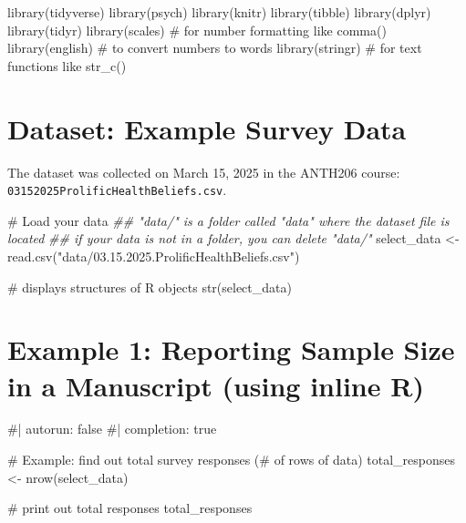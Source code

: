 \documentclass[
  english,
  letterpaper,
  DIV=11,
  numbers=noendperiod]{scrreprt}
\newenvironment{Shaded}{\begin{snugshade}}{\end{snugshade}}
\newcommand{\CommentTok}[1]{\textcolor[rgb]{0.37,0.37,0.37}{#1}}
\newcommand{\DocumentationTok}[1]{\textcolor[rgb]{0.37,0.37,0.37}{\textit{#1}}}
\newcommand{\FunctionTok}[1]{\textcolor[rgb]{0.28,0.35,0.67}{#1}}
\newcommand{\NormalTok}[1]{\textcolor[rgb]{0.00,0.23,0.31}{#1}}
\newcommand{\OtherTok}[1]{\textcolor[rgb]{0.00,0.23,0.31}{#1}}
\newcommand{\StringTok}[1]{\textcolor[rgb]{0.13,0.47,0.30}{#1}}
\begin{document}
\begin{Shaded}
\begin{Highlighting}[]
\FunctionTok{library}\NormalTok{(tidyverse)}
\FunctionTok{library}\NormalTok{(psych)}
\FunctionTok{library}\NormalTok{(knitr)}
\FunctionTok{library}\NormalTok{(tibble)}
\FunctionTok{library}\NormalTok{(dplyr)}
\FunctionTok{library}\NormalTok{(tidyr)}
\FunctionTok{library}\NormalTok{(scales)     }\CommentTok{\# for number formatting like comma()}
\FunctionTok{library}\NormalTok{(english)    }\CommentTok{\# to convert numbers to words}
\FunctionTok{library}\NormalTok{(stringr)    }\CommentTok{\# for text functions like str\_c()}
\end{Highlighting}
\end{Shaded}

\section{Dataset: Example Survey
Data}\label{dataset-example-survey-data}

The dataset was collected on March 15, 2025 in the ANTH206 course:
\texttt{03152025ProlificHealthBeliefs.csv}.

\begin{Shaded}
\begin{Highlighting}[]
\CommentTok{\# Load your data}
\DocumentationTok{\#\#  "data/" is a folder called "data" where the dataset file is located}
\DocumentationTok{\#\# if your data is not in a folder, you can delete "data/"}
\NormalTok{select\_data }\OtherTok{\textless{}{-}} \FunctionTok{read.csv}\NormalTok{(}\StringTok{"data/03.15.2025.ProlificHealthBeliefs.csv"}\NormalTok{)}

\CommentTok{\# displays structures of R objects}
\FunctionTok{str}\NormalTok{(select\_data)}
\end{Highlighting}
\end{Shaded}

\section{Example 1: Reporting Sample Size in a Manuscript (using inline
R)}\label{example-1-reporting-sample-size-in-a-manuscript-using-inline-r}

\begin{Shaded}
\begin{Highlighting}[]
\NormalTok{\#| autorun: false}
\NormalTok{\#| completion: true}

\NormalTok{\# Example: find out total survey responses (\# of rows of data)}
\NormalTok{total\_responses \textless{}{-} nrow(select\_data)}

\NormalTok{\# print out total responses}
\NormalTok{total\_responses}
\end{Highlighting}
\end{Shaded}
\end{document}
